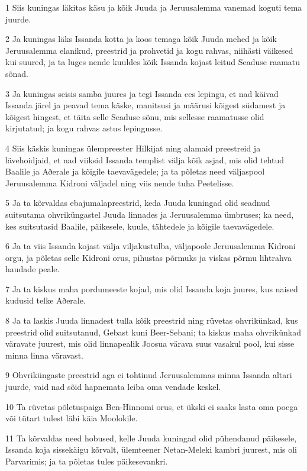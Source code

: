 \par 1 Siis kuningas läkitas käsu ja kõik Juuda ja Jeruusalemma vanemad koguti tema juurde.
\par 2 Ja kuningas läks Issanda kotta ja koos temaga kõik Juuda mehed ja kõik Jeruusalemma elanikud, preestrid ja prohvetid ja kogu rahvas, niihästi väikesed kui suured, ja ta luges nende kuuldes kõik Issanda kojast leitud Seaduse raamatu sõnad.
\par 3 Ja kuningas seisis samba juures ja tegi Issanda ees lepingu, et nad käivad Issanda järel ja peavad tema käske, manitsusi ja määrusi kõigest südamest ja kõigest hingest, et täita selle Seaduse sõnu, mis sellesse raamatusse olid kirjutatud; ja kogu rahvas astus lepingusse.
\par 4 Siis käskis kuningas ülempreester Hilkijat ning alamaid preestreid ja lävehoidjaid, et nad viiksid Issanda templist välja kõik asjad, mis olid tehtud Baalile ja Aðerale ja kõigile taevavägedele; ja ta põletas need väljaspool Jeruusalemma Kidroni väljadel ning viis nende tuha Peetelisse.
\par 5 Ja ta kõrvaldas ebajumalapreestrid, keda Juuda kuningad olid seadnud suitsutama ohvriküngastel Juuda linnades ja Jeruusalemma ümbruses; ka need, kes suitsutasid Baalile, päikesele, kuule, tähtedele ja kõigile taevavägedele.
\par 6 Ja ta viis Issanda kojast välja viljakustulba, väljapoole Jeruusalemma Kidroni orgu, ja põletas selle Kidroni orus, pihustas põrmuks ja viskas põrmu lihtrahva haudade peale.
\par 7 Ja ta kiskus maha pordumeeste kojad, mis olid Issanda koja juures, kus naised kudusid telke Aðerale.
\par 8 Ja ta laskis Juuda linnadest tulla kõik preestrid ning rüvetas ohvrikünkad, kus preestrid olid suitsutanud, Gebast kuni Beer-Sebani; ta kiskus maha ohvrikünkad väravate juurest, mis olid linnapealik Joosua värava suus vasakul pool, kui sisse minna linna väravast.
\par 9 Ohvriküngaste preestrid aga ei tohtinud Jeruusalemmas minna Issanda altari juurde, vaid nad sõid hapnemata leiba oma vendade keskel.
\par 10 Ta rüvetas põletuspaiga Ben-Hinnomi orus, et ükski ei saaks lasta oma poega või tütart tulest läbi käia Moolokile.
\par 11 Ta kõrvaldas need hobused, kelle Juuda kuningad olid pühendanud päikesele, Issanda koja sissekäigu kõrvalt, ülemteener Netan-Meleki kambri juurest, mis oli Parvarimis; ja ta põletas tules päikesevankri.
